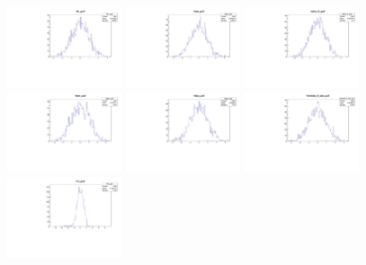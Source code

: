 \begin{figure}[tb]
   \begin{center}
	\includegraphics[width=0.3\textwidth]{figs/MCPulls/fL_pull.pdf}
	\includegraphics[width=0.3\textwidth]{figs/MCPulls/fpe_pull.pdf}
	\includegraphics[width=0.3\textwidth]{figs/MCPulls/phis_0_pull.pdf}
	\includegraphics[width=0.3\textwidth]{figs/MCPulls/dpe_pull.pdf}
	\includegraphics[width=0.3\textwidth]{figs/MCPulls/dpa_pull.pdf}
	\includegraphics[width=0.3\textwidth]{figs/MCPulls/lambda_0_abs_pull.pdf}
	\includegraphics[width=0.3\textwidth]{figs/MCPulls/G_pull.pdf}

\end{center}
\end{figure}

